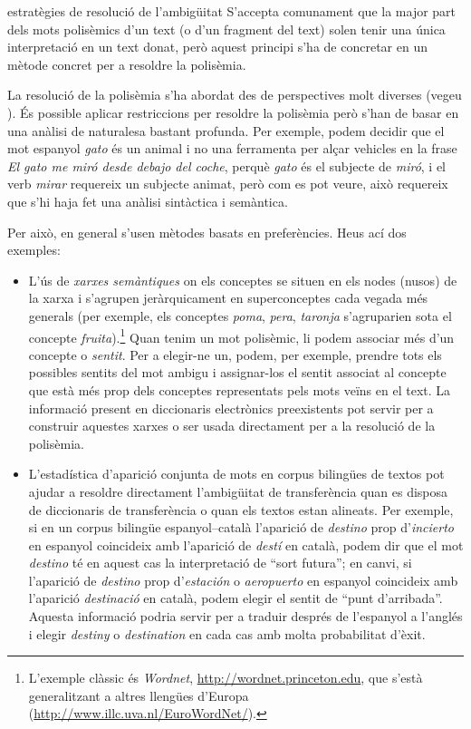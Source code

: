\begin{persabermes}{estratègies de resolució de l'ambigüitat}
  S'accepta comunament que la major part dels mots polisèmics d'un
  text (o d'un fragment del text) solen tenir una única interpretació
  en un text donat, però aquest principi s'ha de concretar en un
  mètode concret per a resoldre la polisèmia.

  La resolució de la polisèmia s'ha abordat des de perspectives molt
  diverses (vegeu \citet{ide98j}).  És possible aplicar restriccions
  per resoldre la polisèmia però s'han de basar en una anàlisi de
  naturalesa bastant profunda. Per exemple, podem decidir que el mot
  espanyol \emph{gato} és un animal i no una ferramenta per alçar
  vehicles en la frase \emph{El gato me miró desde debajo del coche},
  perquè \emph{gato} és el subjecte de \emph{miró}, i el verb
  \emph{mirar} requereix un subjecte animat, però com es pot veure,
  això requereix que s'hi haja fet una anàlisi sintàctica i semàntica.
 
  Per això, en general s'usen mètodes basats en preferències. Heus ací
  dos exemples:
  \begin{itemize}
  \item L'ús de \emph{xarxes semàntiques} on els conceptes se situen
    en els nodes (nusos) de la xarxa i s'agrupen jeràrquicament en
    superconceptes cada vegada més generals (per exemple, els
    conceptes \emph{poma}, \emph{pera}, \emph{taronja} s'agruparien
    sota el concepte \emph{fruita}).\footnote{L'exemple clàssic és
      \emph{Wordnet}, \url{http://wordnet.princeton.edu}, que s'està
      generalitzant a altres llengües d'Europa
      (\url{http://www.illc.uva.nl/EuroWordNet/}).}  Quan tenim un mot
    polisèmic, li podem associar més d'un concepte o
    \emph{sentit}. Per a elegir-ne un, podem, per exemple, prendre
    tots els possibles sentits del mot ambigu i assignar-los el sentit
    associat al concepte que està més prop dels conceptes representats
    pels mots veïns en el text.  La informació present en diccionaris
    electrònics preexistents pot servir per a construir aquestes
    xarxes o ser usada directament per a la resolució de la polisèmia.
  \item L'estadística d'aparició conjunta de mots en corpus bilingües
    de textos pot ajudar a resoldre directament l'ambigüitat de
    transferència quan es disposa de diccionaris de transferència o
    quan els textos estan alineats. Per exemple, si en un corpus
    bilingüe espanyol--català l'aparició de \emph{destino} prop
    d'\emph{incierto} en espanyol coincideix amb l'aparició de
    \emph{destí} en català, podem dir que el mot \emph{destino} té en
    aquest cas la interpretació de ``sort futura''; en canvi, si
    l'aparició de {\em destino} prop d'\emph{estación} o
    \emph{aeropuerto} en espanyol coincideix amb l'aparició
    \emph{destinació} en català, podem elegir el sentit de ``punt
    d'arribada''. Aquesta informació podria servir per a traduir
    després de l'espanyol a l'anglés i elegir {\em destiny} o
    \emph{destination} en cada cas amb molta probabilitat
    d'èxit. %
  \end{itemize}


\end{persabermes}
